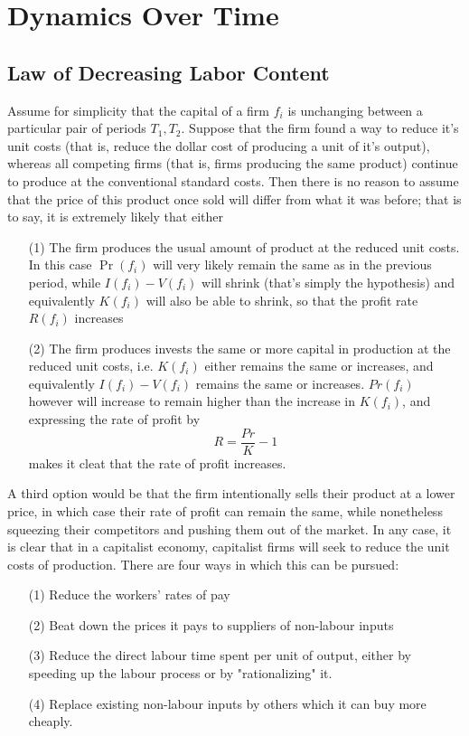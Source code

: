 \section{Dynamics Over Time}
\subsection{Law of Decreasing Labor Content}
	Assume for simplicity that the capital of a firm $f_i$ is unchanging between a particular pair of periods $T_1,T_2$. Suppose that the firm found a way to reduce it's unit costs (that is, reduce the dollar cost of producing a unit of it's output), whereas all competing firms (that is, firms producing the same product) continue to produce at the conventional standard costs. Then there is no reason to assume that the price of this product once sold will differ from what it was before; that is to say, it is extremely likely that either
\begin{itemize}
	\item[(1)] The firm produces the usual amount of product at the reduced unit costs. In this case $\Pr(f_i)$ will very likely remain the same as in the previous period, while $I(f_i)-V(f_i)$ will shrink (that's simply the hypothesis) and equivalently $K(f_i)$ will also be able to shrink, so that the profit rate $R(f_i)$ increases
	\item[(2)] The firm produces invests the same or more capital in production at the reduced unit costs, i.e. $K(f_i)$ either remains the same or increases, and equivalently $I(f_i)-V(f_i)$ remains the same or increases. $Pr(f_i)$ however will increase to remain higher than the increase in $K(f_i)$, and expressing the rate of profit by
	\[ R = \frac{Pr}{K}-1 \]
makes it cleat that the rate of profit increases. 
\end{itemize} 
A third option would be that the firm intentionally sells their product at a lower price, in which case their rate of profit can remain the same, while nonetheless squeezing their competitors and pushing them out of the market. In any case, it is clear that in a capitalist economy, capitalist firms will seek to reduce the unit costs of production. There are four ways in which this can be pursued:
\begin{itemize}
	\item[(1)] Reduce the workers' rates of pay
	\item[(2)] Beat down the prices it pays to suppliers of non-labour inputs
	\item[(3)] Reduce the direct labour time spent per unit of output, either by speeding up the labour process or by "rationalizing" it.
	\item[(4)] Replace existing non-labour inputs by others which it can buy more cheaply. 
\end{itemize} 
